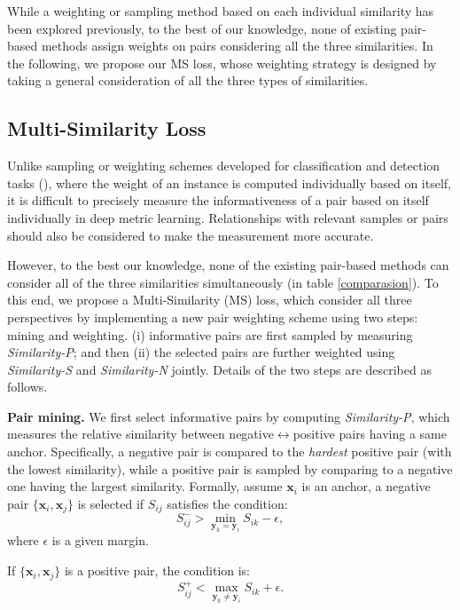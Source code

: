 \documentclass[10pt,twocolumn,letterpaper]{article}
\def\vx{{\bm{x}}}
\def\vy{{\bm{y}}}
\begin{document}
While a weighting or sampling method based on each individual similarity has been explored previously, to the best of our knowledge, none of existing pair-based methods assign weights on pairs considering all the three similarities. In the following, we propose our MS loss, whose weighting strategy is designed by taking a general consideration of all the three types of similarities.

\subsection{Multi-Similarity Loss}
Unlike sampling or weighting schemes developed for classification and detection tasks (\cite{chang2017active,focal_loss}), where the weight of an instance is computed individually based on itself, it is difficult to precisely measure the informativeness of a pair based on itself individually in deep metric learning. Relationships with relevant samples or pairs should also be considered to make the measurement more accurate.  

However, to the best our knowledge, none of the existing pair-based methods can consider all of the three similarities simultaneously (in table \ref{comparasion}). To this end, we propose a Multi-Similarity (MS) loss, which consider all three perspectives by implementing a new pair weighting scheme using two steps: mining and weighting. (i) informative pairs are first sampled by measuring {\it Similarity-P}; and then (ii) the selected pairs are further weighted using {\it Similarity-S} and {\it Similarity-N} jointly. Details of the two steps are described as follows.

{\bf Pair mining.}  We first select informative pairs by computing {\it Similarity-P}, which measures the relative similarity between negative$\leftrightarrow$positive pairs having a same anchor.
Specifically, a negative pair is compared to the {\it hardest} positive pair (with the lowest similarity), while a positive pair is sampled by comparing to a negative one having the largest similarity. Formally, assume $\vx_i$ is an anchor, a negative pair  $\{\vx_i, \vx_j\}$ is selected if $S_{ij}$ satisfies the condition:
\begin{equation}
\label{eq-select-neg}
S^{-}_{ij} > \min_{\vy_k = \vy_i} S_{ik} - \epsilon,
\end{equation}
where $\epsilon$ is a given margin.

If $\{\vx_i, \vx_j\}$ is a positive pair, the condition is:
\begin{equation}
\label{eq-select-pos}
S^{+}_{ij} < \max_{\vy_k \neq \vy_i} S_{ik} + \epsilon.
\end{equation}
\end{document}
